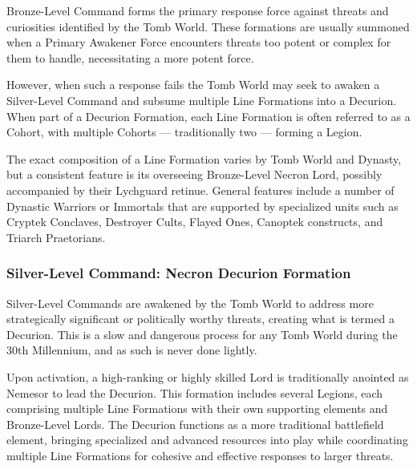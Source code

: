 Bronze-Level Command forms the primary response force against threats and curiosities identified by the Tomb World. These formations are usually summoned when a Primary Awakener Force encounters threats too potent or complex for them to handle, necessitating a more potent force. 

However, when such a response fails the Tomb World may seek to awaken a Silver-Level Command and subsume multiple Line Formations into a Decurion. When part of a Decurion Formation, each Line Formation is often referred to as a Cohort, with multiple Cohorts — traditionally two — forming a Legion.

The exact composition of a Line Formation varies by Tomb World and Dynasty, but a consistent feature is its overseeing Bronze-Level Necron Lord, possibly accompanied by their Lychguard retinue. General features include a number of Dynastic Warriors or Immortals that are supported by specialized units such as Cryptek Conclaves, Destroyer Cults, Flayed Ones, Canoptek constructs, and Triarch Praetorians.


\subsubsection{Silver-Level Command: Necron Decurion Formation}

Silver-Level Commands are awakened by the Tomb World to address more strategically significant or politically worthy threats, creating what is termed a Decurion. This is a slow and dangerous process for any Tomb World during the 30th Millennium, and as such is never done lightly. 

Upon activation, a high-ranking or highly skilled Lord is traditionally anointed as Nemesor to lead the Decurion. This formation includes several Legions, each comprising multiple Line Formations with their own supporting elements and Bronze-Level Lords. The Decurion functions as a more traditional battlefield element, bringing specialized and advanced resources into play while coordinating multiple Line Formations for cohesive and effective responses to larger threats.

